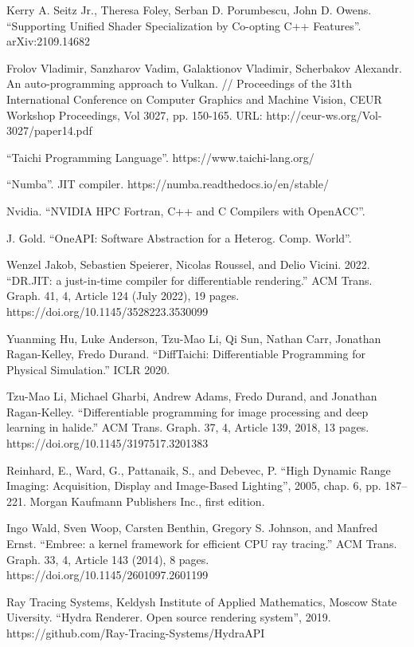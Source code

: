\documentclass[11pt,fleqn,english,russian]{report} %
\begin{document}
\begin{thebibliography}{10}
	 Kerry A. Seitz Jr., Theresa Foley, Serban D. Porumbescu, John D. Owens. ``Supporting Unified Shader Specialization by Co-opting C++ Features''. arXiv:2109.14682 
	
	 Frolov Vladimir, Sanzharov Vadim, Galaktionov Vladimir, Scherbakov Alexandr. An auto-programming approach to Vulkan. // Proceedings of the 31th International Conference on Computer Graphics and Machine Vision, CEUR Workshop Proceedings, Vol 3027, pp. 150-165. URL: http://ceur-ws.org/Vol-3027/paper14.pdf 
	
	 ``Taichi Programming Language''. https://www.taichi-lang.org/
	
	 ``Numba''. JIT compiler. https://numba.readthedocs.io/en/stable/
	
	 Nvidia. ``NVIDIA HPC Fortran, C++ and C Compilers with OpenACC''.
	
	 J. Gold. ``OneAPI: Software Abstraction for a Heterog. Comp. World''. 
	
	 Wenzel Jakob, Sebastien Speierer, Nicolas Roussel, and Delio Vicini. 2022. ``DR.JIT: a just-in-time compiler for differentiable rendering.'' ACM Trans. Graph. 41, 4, Article 124 (July 2022), 19 pages. https://doi.org/10.1145/3528223.3530099
	
	 Yuanming Hu, Luke Anderson, Tzu-Mao Li, Qi Sun, Nathan Carr, Jonathan Ragan-Kelley, Fredo Durand. ``DiffTaichi: Differentiable Programming for Physical Simulation.'' ICLR 2020.
	
	 Tzu-Mao Li, Michael Gharbi, Andrew Adams, Fredo Durand, and Jonathan Ragan-Kelley. ``Differentiable programming for image processing and deep learning in halide.'' ACM Trans. Graph. 37, 4, Article 139, 2018, 13 pages. https://doi.org/10.1145/3197517.3201383
	
	 Reinhard, E., Ward, G., Pattanaik, S., and Debevec, P. ``High Dynamic Range Imaging: Acquisition, Display and Image-Based Lighting'', 2005, chap. 6, pp. 187–221. Morgan Kaufmann Publishers Inc., first edition.
	
	 Ingo Wald, Sven Woop, Carsten Benthin, Gregory S. Johnson, and Manfred Ernst. ``Embree: a kernel framework for efficient CPU ray tracing.'' ACM Trans. Graph. 33, 4, Article 143 (2014), 8 pages. https://doi.org/10.1145/2601097.2601199
	
	 Ray Tracing Systems, Keldysh Institute of Applied Mathematics, Moscow State Uiversity. ``Hydra Renderer. Open source rendering system'', 2019.
	https://github.com/Ray-Tracing-Systems/HydraAPI
	

\end{thebibliography}
\end{document}
